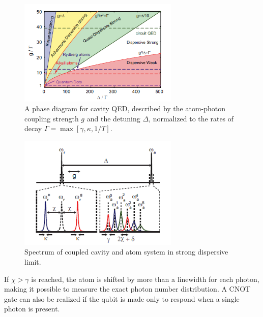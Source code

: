 \documentclass[8pt,a4paper,twocolumn]{article} %
\numberwithin{equation}{section} %
\begin{document}
			\begin{figure}[!h]
				\centering
				\includegraphics[width=3in]{cQEDphase.png}
				\caption{A phase diagram for cavity QED, described by the atom-photon coupling strength $g$ and the detuning $\Delta$, normalized to the rates of decay $\Gamma = \max[ \gamma,\kappa,1/T ]. $\cite{Schuster2007}}
				\label{pic:EnLevelOfJCH}
			\end{figure}

			\begin{figure}[!h]
				\centering
				\includegraphics[width=3in]{spectrumInSDlimit.png}
				\caption{Spectrum of coupled cavity and atom system in strong dispersive limit. \cite{Schuster2007}}
				\label{pic:EnLevelOfJCH}
			\end{figure}

			If $\chi>\gamma$ is reached, the atom is shifted by more than a linewidth for each photon, making it possible to measure the exact photon number distribution. A CNOT gate can also be realized if the qubit is made only to respond when a single photon is present.








	
\end{document}
